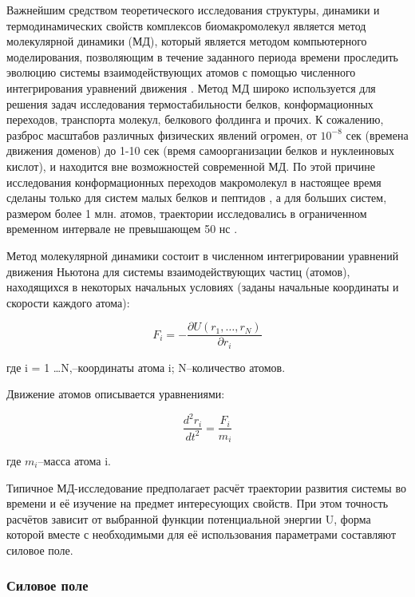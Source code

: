 Важнейшим средством теоретического исследования структуры, динамики и термодинамических свойств комплексов биомакромолекул является метод молекулярной динамики (МД), который является методом компьютерного моделирования, позволяющим в течение заданного периода времени проследить эволюцию системы взаимодействующих атомов с помощью численного интегрирования уравнений движения \cite{Alder1957,Gibson1960}. Метод МД широко используется для решения задач исследования термостабильности белков, конформационных переходов, транспорта молекул, белкового фолдинга и прочих. К сожалению, разброс масштабов различных физических явлений огромен, от $10^{-8}$ сек (времена движения доменов) до 1-10 сек (время самоорганизации белков и нуклеиновых кислот), и находится вне возможностей современной МД. По этой причине исследования конформационных переходов макромолекул в настоящее время сделаны только для систем малых белков и пептидов \cite{Zhou2002,Nymeyer2003}, а для больших систем, размером более 1 млн. атомов, траектории исследовались в ограниченном временном интервале не превышающем 50 нс \cite{Freddolino2006}. 

Метод молекулярной динамики состоит в численном интегрировании уравнений движения Ньютона для системы взаимодействующих частиц (атомов), находящихся в некоторых начальных условиях (заданы начальные координаты и скорости каждого атома):

\[
F_i = -\frac{\partial U(r_1,\ldots,r_N)}{\partial r_i}
\]

где i = 1 \ldots N,--координаты атома i; N--количество атомов.

Движение атомов описывается уравнениями:

\begin{equation}
\label{eq:newton_motion}
\frac{d^2r_i}{dt^2}=\frac{F_i}{m_i}
\end{equation}

где $m_i$--масса атома i.

Типичное МД-исследование предполагает расчёт траектории развития системы во времени и её изучение на предмет интересующих свойств. При этом точность расчётов зависит от выбранной функции потенциальной энергии U, форма которой вместе с необходимыми для её использования параметрами составляют силовое поле. 

\subsubsection{Силовое поле} \label{sect_methods_forcefield}

